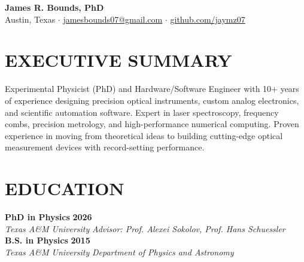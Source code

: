 \documentclass[a4paper,11pt]{extarticle}
\newcommand{\resumeentry}[4]{
	\noindent\textbf{#2} \hfill \textbf{#1}\\
	\textit{#3} \hfill \textit{#4}\\[0.2em]
}
\newcommand{\resumeentryC}[4]{
	\noindent\textbf{#2} \hfill \textbf{#1}\\
	\textit{#3} \hfill \textit{#4}
}
\begin{document}
	\pagestyle{empty}
	
	\begin{center}
		{\LARGE \bfseries James R. Bounds, PhD} \\[0.3em]
		Austin, Texas \quad$\cdot$\quad 
		\href{mailto:jamesbounds07@gmail.com}{jamesbounds07@gmail.com} \quad$\cdot$\quad 
		\href{https://github.com/jaymz07}{github.com/jaymz07}
	\end{center}
	
	\section*{EXECUTIVE SUMMARY}
	Experimental Physicist (PhD) and Hardware/Software Engineer with 10+ years of experience designing precision optical instruments, custom analog electronics, and scientific automation software. Expert in laser spectroscopy, frequency combs, precision metrology, and high-performance numerical computing. Proven experience in moving from theoretical ideas to building cutting-edge optical measurement devices with record-setting performance.
	
	\section*{EDUCATION}
	\resumeentry{2026}{PhD in Physics}{Texas A\&M University}{Advisor: Prof. Alexei Sokolov, Prof. Hans Schuessler}
	\resumeentryC{2015}{B.S. in Physics}{Texas A\&M University}{Department of Physics and Astronomy}
	
\end{document}
